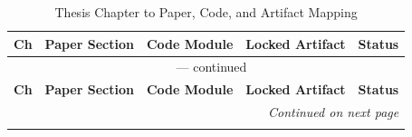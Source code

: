 \begin{small}
\begin{longtable}{@{}p{1.2cm}p{2.8cm}p{2.2cm}p{3.2cm}p{1.8cm}@{}}
\caption{Thesis Chapter to Paper, Code, and Artifact Mapping} \label{tab:blueprint-matrix} \\
\toprule
\textbf{Ch} & \textbf{Paper Section} & \textbf{Code Module} & \textbf{Locked Artifact} & \textbf{Status} \\
\midrule
\endfirsthead

\multicolumn{5}{c}{\tablename\ \thetable{} --- continued} \\
\toprule
\textbf{Ch} & \textbf{Paper Section} & \textbf{Code Module} & \textbf{Locked Artifact} & \textbf{Status} \\
\midrule
\endhead

\midrule
\multicolumn{5}{r}{\textit{Continued on next page}} \\
\endfoot

\bottomrule
\endlastfoot


\end{longtable}
\end{small}
